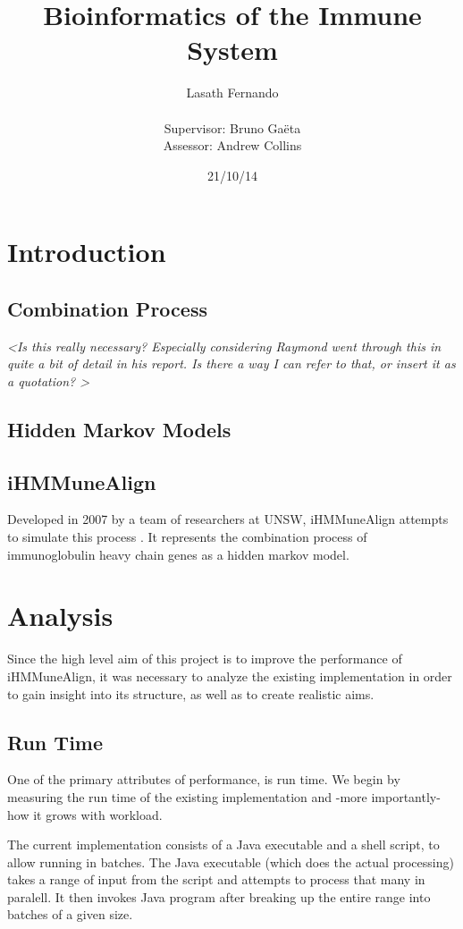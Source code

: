 \documentclass[a4paper,12pt]{report}
\author{Lasath Fernando\\\\
Supervisor: Bruno Ga\"{e}ta\\
Assessor: Andrew Collins}
\title{Bioinformatics of the Immune System}
\date{21/10/14}
\begin{document}
\maketitle


\chapter{Introduction}
\section{Combination Process}
\emph{\textless Is this really necessary? Especially considering Raymond went through this in quite a bit of detail in his report. Is there a way I can refer to that, or insert it as a quotation? \textgreater}

\section{Hidden Markov Models}
\section{iHMMuneAlign}
Developed in 2007 by a team of researchers at UNSW, iHMMuneAlign attempts to simulate this process \autocite{iHMMuneAlign}.
It represents the combination process of immunoglobulin heavy chain genes as a hidden markov model.


\chapter{Analysis}
Since the high level aim of this project is to improve the performance of iHMMuneAlign, it was necessary to analyze the existing implementation in order to gain insight into its structure, as well as to create realistic aims. 

\section{Run Time}
One of the primary attributes of performance, is run time. We begin by measuring the run time of the existing implementation and -more importantly- how it grows with workload.

The current implementation consists of a Java executable and a shell script, to allow running in batches. The Java executable (which does the actual processing) takes a range of input from the script and attempts to process that many in paralell. It then invokes Java program after breaking up the entire range into batches of a given size.
\end{document}
